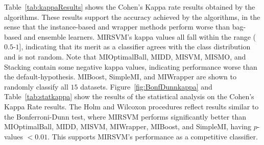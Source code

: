 \documentclass[reqno]{vcuthesis}
\numberwithin{equation}{chapter}
\begin{document}
\begin{table}[b!]
{}\vspace{-1.3em}
\label{fig:BonfDunnkappa}
\vspace{-1.3em}
\label{tab:statkappa}
\vspace{-1em}
\scriptsize \centering
{}
\end{table}
Table~\ref{tab:kappaResults} shows the Cohen's Kappa rate results obtained by the algorithms. These results support the accuracy achieved by the algorithms, in the sense that the instance-based and wrapper methods perform worse than bag-based and ensemble learners. MIRSVM's kappa values all fall within the range ($0.5$-$1$], indicating that its merit as a classifier agrees with the class distribution and is not random. Note that MIOptimalBall, MIDD, MISVM, MISMO, and Stacking contain some negative kappa values, indicating performance worse than the default-hypothesis. MIBoost, SimpleMI, and MIWrapper are shown to randomly classify all $15$ datasets. Figure~\ref{fig:BonfDunnkappa} and Table~\ref{tab:statkappa} show the results of the statistical analysis on the Cohen's Kappa Rate results. The Holm and Wilcoxon procedures reflect results similar to the Bonferroni-Dunn test, where MIRSVM performs significantly better than MIOptimalBall, MIDD, MISVM, MIWrapper, MIBoost, and SimpleMI, having $p$-values $< 0.01$. This supports MIRSVM's performance as a competitive classifier.
\end{document}
